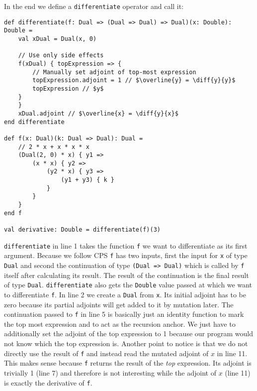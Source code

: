 In the end we define a \lstinline{differentiate} operator and call it:
\begin{lstlisting}[mathescape=true]
def differentiate(f: Dual => (Dual => Dual) => Dual)(x: Double): Double =
    val xDual = Dual(x, 0)

    // Use only side effects
    f(xDual) { topExpression => {
        // Manually set adjoint of top-most expression
        topExpression.adjoint = 1 // $\overline{y} = \diff{y}{y}$
        topExpression // $y$
    }
    }
    xDual.adjoint // $\overline{x} = \diff{y}{x}$
end differentiate

def f(x: Dual)(k: Dual => Dual): Dual =
    // 2 * x + x * x * x
    (Dual(2, 0) * x) { y1 =>
        (x * x) { y2 =>
            (y2 * x) { y3 =>
                (y1 + y3) { k }
            }
        }
    }
end f

val derivative: Double = differentiate(f)(3)
\end{lstlisting}
\lstinline{differentiate} in line 1 takes the function \lstinline{f} we want to differentiate as its first argument. Because we follow CPS \lstinline{f} has two inputs, first the input for \lstinline{x} of type \lstinline{Dual} and second the continuation of type \lstinline{(Dual => Dual)} which is called by \lstinline{f} itself after calculating its result. The result of the continuation is the final result of type \lstinline{Dual}. \lstinline{differentiate} also gets the \lstinline{Double} value passed at which we want to differentiate \lstinline{f}. In line 2 we create a \lstinline{Dual} from \lstinline{x}. Its initial adjoint has to be zero because its partial adjoints will get added to it by mutation later. The continuation passed to \lstinline{f} in line 5 is basically just an identity function to mark the top most expression and to act as the recursion anchor. We just have to additionally set the adjoint of the top expression to 1 because our program would not know which the top expression is. Another point to notice is that we do not directly use the result of \lstinline{f} and instead read the mutated adjoint of $x$ in line 11. This makes sense because \lstinline{f} returns the result of the \emph{top} expression. Its adjoint is trivially 1 (line 7) and therefore is not interesting while the adjoint of $x$ (line 11) is exactly the derivative of \lstinline{f}.


